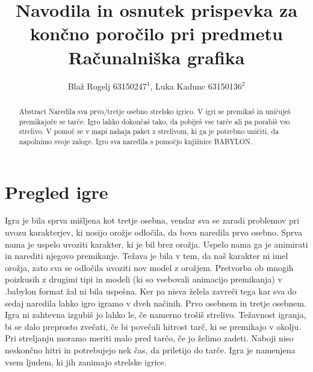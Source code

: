 \documentclass[a4paper]{article}
\begin{document}
\title{Navodila in osnutek prispevka za končno poročilo pri predmetu Računalniška grafika}

\author{Blaž Rogelj 63150247$^{1}$, Luka Kadunc 63150136$^{2}$} %



\maketitle


\begin{abstract}{Abstract}
Naredila sva prvo/tretje osebno strelsko igrico. V igri se premikaš in uničuješ premikajoče se tarče. 
Igro lahko dokončaš tako, da pobiješ vse tarče ali pa porabiš vso strelivo.
V pomoč se v mapi nahaja paket z strelivom, ki ga je potrebno uničiti, da napolnimo svoje zaloge.
Igro sva naredila s pomočjo knjižnice BABYLON.

\end{abstract}




\section{Pregled igre}
Igra je bila sprva mišljena kot tretje osebna, vendar sva se zaradi problemov pri uvozu karakterjev, ki nosijo orožje odločila, da bova naredila prvo osebno.
Sprva nama je uspelo uvoziti karakter, ki je bil brez orožja. Uspelo nama ga je animirati in narediti njegovo premikanje.
Težava je bila v tem, da naš karakter ni imel orožja, zato sva se odločila uvoziti nov model z orožjem. 
Pretvorba ob mnogih poizkusih z drugimi tipi in modeli (ki so vsebovali animacijo premikanja) v .babylon format žal ni bila uspešna.
Ker pa nisva želela zavreči tega kar sva do sedaj naredila lahko igro igramo v dveh načinih. Prvo osebnem in tretje osebnem.
Igra ni zahtevna izgubiš jo lahko le, če namerno trošiš strelivo. Težavnost igranja, bi se dalo preprosto zvečati, če bi povečali hitrost tarč, ki se premikajo v okolju.
Pri streljanju moramo meriti malo pred tarčo, če jo želimo zadeti. Naboji niso neskončno hitri in potrebujejo nek čas, da priletijo do tarče.
Igra je namenjena vsem ljudem, ki jih zanimajo strelske igrice.
\end{document}
